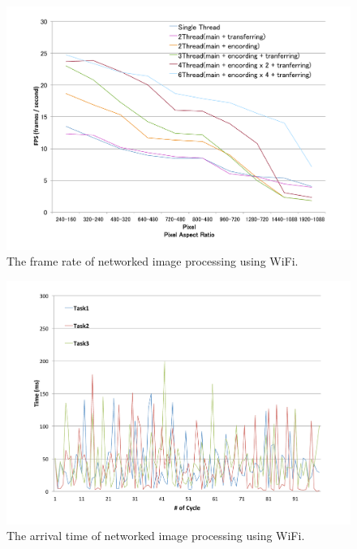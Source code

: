 \begin{figure}[!t]
 \centering
 \includegraphics[width=\hsize]{fig/No8_TIPiC_FPS_graph_WiFi.pdf}
 \caption{The frame rate of networked image processing using WiFi.}
 \label{fig:no8}
\end{figure}

\begin{figure}[!t]
 \centering
 \includegraphics[width=\hsize]{fig/No9_TIPiC_serv_cycle_WiFi.pdf}
 \caption{The arrival time of networked image processing using WiFi.}
 \label{fig:no9}
\end{figure}

